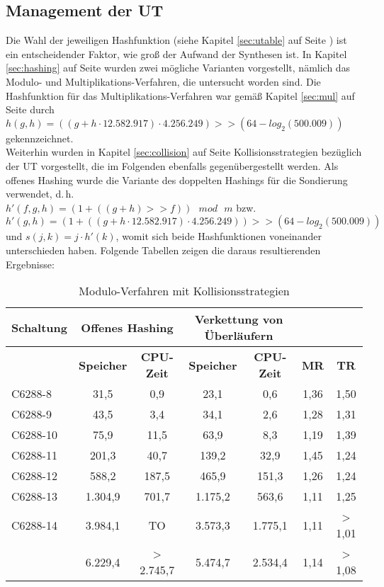 \subsection{Management der UT}
\label{sec:ovh}
Die Wahl der jeweiligen Hashfunktion (siehe Kapitel \ref{sec:utable} auf Seite \pageref{sec:utable}) ist ein entscheidender Faktor, wie groß der Aufwand der Synthesen ist. In Kapitel \ref{sec:hashing} auf Seite \pageref{sec:hashing} wurden zwei mögliche Varianten vorgestellt, nämlich das Modulo- und Multiplikations-Verfahren, die untersucht worden sind. Die Hashfunktion für das Multiplikations-Verfahren war gemäß Kapitel \ref{sec:mul} auf Seite \pageref{sec:mul} durch  $h(g, h) = ((g+h\cdot 12.582.917)\cdot 4.256.249) >> (64 - log_2(500.009))$ gekennzeichnet.\\
Weiterhin wurden in Kapitel \ref{sec:collision} auf Seite \pageref{sec:collision} Kollisionsstrategien bezüglich der UT vorgestellt, die im Folgenden ebenfalls gegenübergestellt werden. Als offenes Hashing wurde die Variante des doppelten Hashings für die Sondierung verwendet, d.\,h. \\$h'(f, g, h) = (1 + ( (g + h) >> f)) \text{ }mod\text{ } m$ bzw. $h'(g, h) = (1+((g+h\cdot 12.582.917)\cdot 4.256.249)) >> (64 - log_2(500.009))$ und $s(j,k) = j \cdot h'(k)$, womit sich beide Hashfunktionen voneinander unterschieden haben. Folgende Tabellen zeigen die daraus resultierenden Ergebnisse:
\begin{table}[bth]
	\footnotesize
	\centering
	\caption{Modulo-Verfahren mit Kollisionsstrategien}
	\label{tab:ovh}
	\begin{tabular}{ | l | c | c | c | c | c | c |}
		\hline
		\multicolumn{1}{|c|}{\textbf{Schaltung}} & \multicolumn{2}{c|}{\textbf{Offenes Hashing}} & \multicolumn{2}{c|}{\textbf{Verkettung von Überläufern}} & \multicolumn{2}{c|}{~} \\ \hline
		~ & \multicolumn{1}{c|}{\textbf{Speicher}} & \multicolumn{1}{c|}{\textbf{CPU-Zeit}} & \multicolumn{1}{c|}{\textbf{Speicher}} & \multicolumn{1}{c|}{\textbf{CPU-Zeit}} & \multicolumn{1}{c|}{\textbf{MR}} & \multicolumn{1}{c|}{\textbf{TR}}\\ \hline
		C6288-8 & 31,5 & 0,9 & 23,1 & 0,6 & 1,36 & 1,50  \\ \hline
		C6288-9 & 43,5 & 3,4 & 34,1 & 2,6 & 1,28 & 1,31  \\ \hline
		C6288-10 & 75,9 & 11,5 & 63,9 & 8,3 & 1,19 & 1,39  \\ \hline
		C6288-11 & 201,3 & 40,7 & 139,2 & 32,9 & 1,45 & 1,24  \\ \hline
		C6288-12 & 588,2 & 187,5 & 465,9 & 151,3 & 1,26 & 1,24  \\ \hline
		C6288-13 & 1.304,9 & 701,7 & 1.175,2 & 563,6 & 1,11 & 1,25 \\ \hline
		C6288-14 & 3.984,1 & TO & 3.573,3 & 1.775,1 & 1,11 & > 1,01 \\ \hlineB{3}
		\multicolumn{1}{|c|}{\textbf{Gesamt}} & 6.229,4 & > 2.745,7 & 5.474,7 & 2.534,4 & 1,14 & > 1,08 \\ \hline
	\end{tabular}
\end{table}
